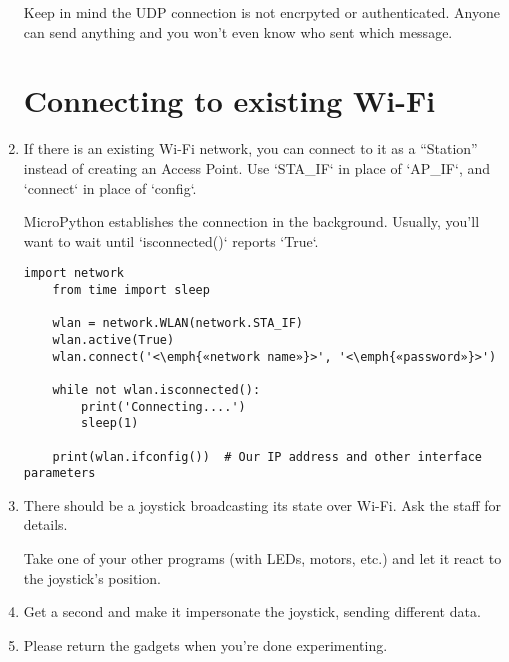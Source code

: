 \documentclass{../tutorial}
\begin{document}
\begin{enumerate}
    Keep in mind the UDP connection is not encrpyted or authenticated.
    Anyone can send anything and you won't even know who sent which message.

\section{Connecting to existing Wi-Fi}

\item
    If there is an existing Wi-Fi network, you can connect to it as a “Station”
    instead of creating an Access Point.
    Use `STA_IF` in place of `AP_IF`, and `connect` in place of `config`.

    MicroPython establishes the connection in the background.
    Usually, you'll want to wait until `isconnected()` reports `True`.

    \begin{lstlisting}[escapeinside=<>]
    import network
    from time import sleep

    wlan = network.WLAN(network.STA_IF)
    wlan.active(True)
    wlan.connect('<\emph{«network name»}>', '<\emph{«password»}>')

    while not wlan.isconnected():
        print('Connecting....')
        sleep(1)

    print(wlan.ifconfig())  # Our IP address and other interface parameters
    \end{lstlisting}

\item
    There should be a joystick broadcasting its state over Wi-Fi.
    Ask the staff for details.

    Take one of your other programs (with LEDs, motors, etc.)
    and let it react to the joystick's position.

\item
    Get a second  and make it impersonate the joystick,
    sending different data.

\item
    Please return the gadgets when you're done experimenting.

\end{enumerate}
\end{document}
